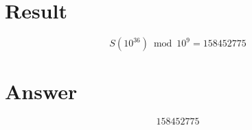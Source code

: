 \documentclass[12pt]{article}
\begin{document}
\section{Result}
\[
S(10^{36}) \bmod 10^9 = \boxed{158452775}
\]

\section{Answer}

\[
\boxed{158452775}
\]
\end{document}
